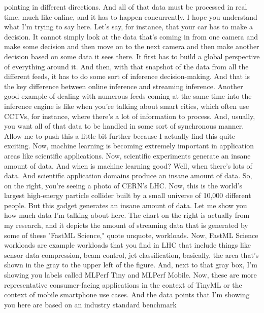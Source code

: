 {{{{{{{    pointing in different directions.
    And all of that data must be processed in real time, much like online,
    and it has to happen concurrently.
    I hope you understand what I'm trying to say here.
    Let's say, for instance, that your car has to make a decision.
    It cannot simply look at the data that's coming in from one camera and make some
    decision and then move on to the next camera and then make another decision
    based on some data it sees there.
    It first has to build a global perspective of everything around it.
    And then, with that snapshot of the data from all the different feeds,
    it has to do some sort of inference decision-making.
    And that is the key difference between online inference and streaming
    inference.
    Another good example of dealing with numerous feeds coming at the same time
    into the inference engine is like when you're
    talking about smart cities, which often use CCTVs, for instance, where there's
    a lot of information to process.
    And, usually, you want all of that data to be handled
    in some sort of synchronous manner.
    Allow me to push this a little bit further because I actually
    find this quite exciting.
    Now, machine learning is becoming extremely important in application
    areas like scientific applications.
    Now, scientific experiments generate an insane amount of data.
    And when is machine learning good?
    Well, when there's lots of data.
    And scientific application domains produce an insane amount of data.
    So, on the right, you're seeing a photo of CERN's LHC.
    Now, this is the world's largest high-energy particle collider
    built by a small universe of 10,000 different people.
    But this gadget generates an insane amount of data.
    Let me show you how much data I'm talking about here.
    The chart on the right is actually from my research,
    and it depicts the amount of streaming data
    that is generated by some of these "FastML Science,"
    quote unquote, workloads.
    Now, FastML Science workloads are example workloads
    that you find in LHC that include things like sensor data compression, beam
    control, jet classification, basically, the area that's shown in the gray
    to the upper left of the figure.
    And, next to that gray box, I'm showing you
    labels called MLPerf Tiny and MLPerf Mobile.
    Now, these are more representative consumer-facing applications
    in the context of TinyML or the context of mobile smartphone use cases.
    And the data points that I'm showing you here
    are based on an industry standard benchmark
}}}}}}}
